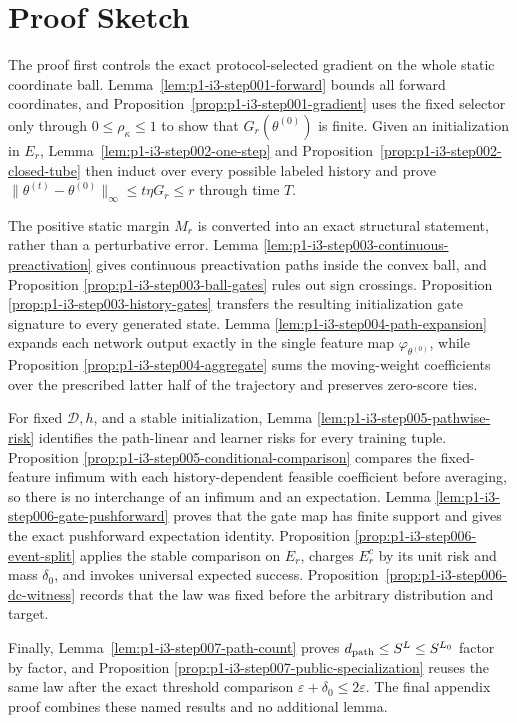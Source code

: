 \section{Proof Sketch}
\label{sec:proof-sketch}

The proof first controls the exact protocol-selected gradient on the whole
static coordinate ball.  Lemma~\ref{lem:p1-i3-step001-forward} bounds all
forward coordinates, and Proposition~\ref{prop:p1-i3-step001-gradient} uses
the fixed selector only through $0\leq\rho_\kappa\leq1$ to show that
$G_r(\theta^{(0)})$ is finite.  Given an initialization in $E_r$,
Lemma~\ref{lem:p1-i3-step002-one-step} and
Proposition~\ref{prop:p1-i3-step002-closed-tube} then induct over every
possible labeled history and prove
$\|\theta^{(t)}-\theta^{(0)}\|_\infty\leq t\eta G_r\leq r$ through time $T$.

The positive static margin $M_r$ is converted into an exact structural
statement, rather than a perturbative error.  Lemma
\ref{lem:p1-i3-step003-continuous-preactivation} gives continuous
preactivation paths inside the convex ball, and Proposition
\ref{prop:p1-i3-step003-ball-gates} rules out sign crossings.  Proposition
\ref{prop:p1-i3-step003-history-gates} transfers the resulting initialization
gate signature to every generated state.  Lemma
\ref{lem:p1-i3-step004-path-expansion} expands each network output exactly in
the single feature map $\varphi_{\theta^{(0)}}$, while Proposition
\ref{prop:p1-i3-step004-aggregate} sums the moving-weight coefficients over
the prescribed latter half of the trajectory and preserves zero-score ties.

For fixed $\mathcal D,h$, and a stable initialization, Lemma
\ref{lem:p1-i3-step005-pathwise-risk} identifies the path-linear and learner
risks for every training tuple.  Proposition
\ref{prop:p1-i3-step005-conditional-comparison} compares the fixed-feature
infimum with each history-dependent feasible coefficient before averaging,
so there is no interchange of an infimum and an expectation.  Lemma
\ref{lem:p1-i3-step006-gate-pushforward} proves that the gate map has finite
support and gives the exact pushforward expectation identity.  Proposition
\ref{prop:p1-i3-step006-event-split} applies the stable comparison on $E_r$,
charges $E_r^c$ by its unit risk and mass $\delta_0$, and invokes universal
expected success.  Proposition~\ref{prop:p1-i3-step006-dc-witness} records
that the law was fixed before the arbitrary distribution and target.

Finally, Lemma~\ref{lem:p1-i3-step007-path-count} proves
$d_{\rm path}\leq S^L\leq S^{L_0}$ factor by factor, and Proposition
\ref{prop:p1-i3-step007-public-specialization} reuses the same law after the
exact threshold comparison $\varepsilon+\delta_0\leq2\varepsilon$.
The final appendix proof combines these named results and no additional
lemma.
